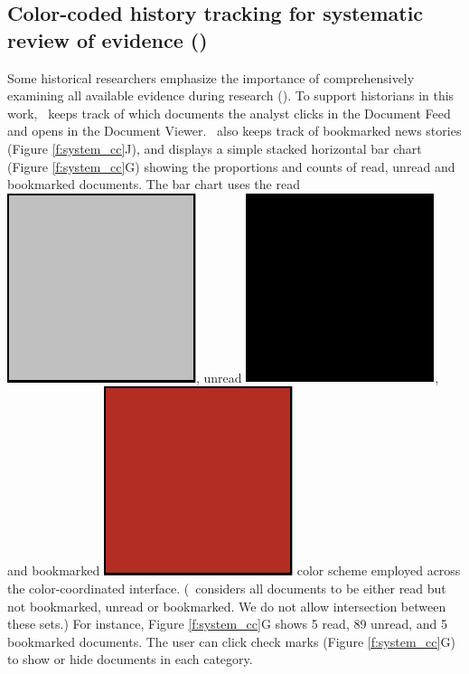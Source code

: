 \subsection{Color-coded history tracking for systematic review of evidence (\rcomprehensive)}\label{s:tracking}
Some historical researchers emphasize the importance of comprehensively examining all available evidence during research (\rcomprehensive).
To support historians in this work, \ours~keeps track of which documents the analyst clicks in the Document Feed and opens in the Document Viewer.
\ours~also keeps track of bookmarked news stories (Figure \ref{f:system_cc}J), and displays a simple stacked horizontal bar chart (Figure \ref{f:system_cc}G) showing the proportions and counts of read, unread and bookmarked documents. 
The bar chart uses the read \includegraphics[scale=0.06]{figures/CCSilver.pdf}, unread \includegraphics[scale=0.06]{figures/CCBlack.pdf}, and bookmarked \includegraphics[scale=0.06]{figures/CCRed.pdf} color scheme employed across the color-coordinated interface.
(\ours~considers all documents to be either read but not bookmarked, unread or bookmarked. We do not allow intersection between these sets.)
For instance, Figure \ref{f:system_cc}G shows 5 read, 89 unread, and 5 bookmarked documents.
The user can click check marks (Figure \ref{f:system_cc}G) to show or hide documents in each category.

